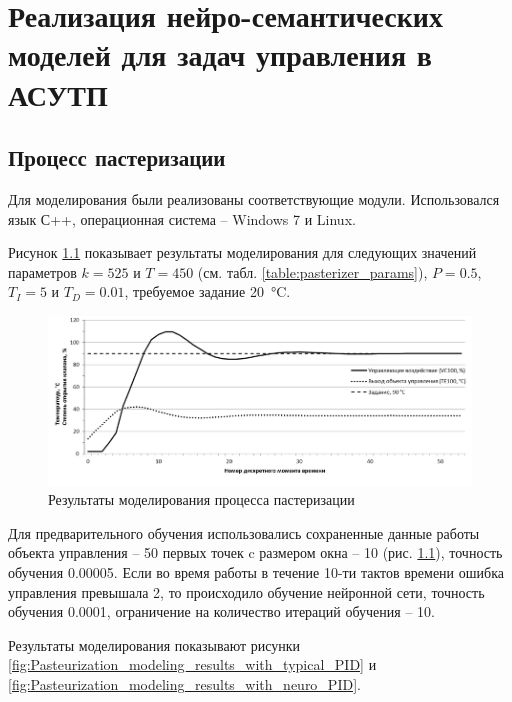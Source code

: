 \chapter{Реализация нейро-семантических моделей для задач управления в АСУТП}

\section{Процесс пастеризации}

Для моделирования были реализованы соответствующие модули. Использовался язык С++, операционная система – Windows 7 и Linux.

Рисунок \ref{fig:Pasteurization_modeling_results} показывает результаты моделирования для следующих значений параметров $k = 525$ и $T = 450$ (см. табл. \ref{table:pasterizer_params}), $P = 0.5$, $T_I = 5$ и $T_D = 0.01$, требуемое задание \SI{20}{\celsius}.

\begin{figure}[H]
    \centering
    \includegraphics[width=\textwidth,height=\textheight,keepaspectratio]{images/chapter_4/Pasteurization_modeling_results.png}
    \caption{Результаты моделирования процесса пастеризации}
    \label{fig:Pasteurization_modeling_results}
\end{figure}

Для предварительного обучения использовались сохраненные данные работы объекта управления – 50 первых точек c размером окна – 10 (рис. \ref{fig:Pasteurization_modeling_results}), точность обучения 0.00005. Если во время работы в течение 10-ти тактов времени ошибка управления превышала 2, то происходило обучение нейронной сети, точность обучения 0.0001, ограничение на количество итераций обучения – 10.

Результаты моделирования показывают рисунки \ref{fig:Pasteurization_modeling_results_with_typical_PID} и \ref{fig:Pasteurization_modeling_results_with_neuro_PID}.


